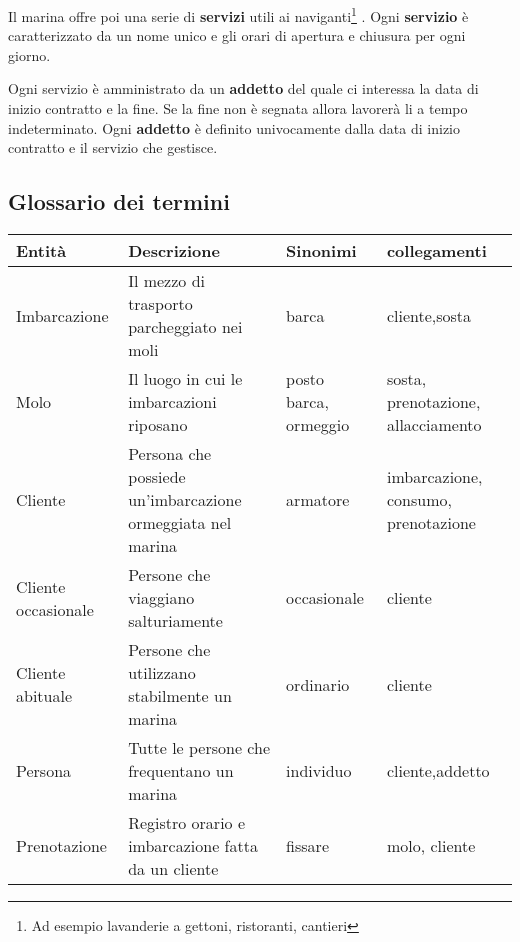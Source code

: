 Il marina offre poi una serie di \textbf{servizi} utili ai naviganti\footnote{Ad esempio lavanderie a gettoni, ristoranti, cantieri} . Ogni \textbf{servizio} è caratterizzato da un nome unico e gli orari di apertura e chiusura per ogni giorno.

Ogni servizio è amministrato da un \textbf{addetto} del quale ci interessa la data di inizio contratto e la fine. Se la fine non è segnata allora lavorerà li a tempo indeterminato. Ogni \textbf{addetto} è definito univocamente dalla data di inizio contratto e il servizio che gestisce.

\subsection{Glossario dei termini}

\begin{center}
    \begin{tabularx}{\textwidth}{|p{2.4cm}|p{8cm}|p{2.4cm}|X|}
        \hline
        \textbf{Entità} & \textbf{Descrizione} & \textbf{Sinonimi} & \textbf{collegamenti} \\
       
        \hline
        Imbarcazione & Il mezzo di trasporto parcheggiato nei moli & barca & cliente,sosta\\
        
        \hline
        Molo & Il luogo in cui le imbarcazioni riposano & posto barca, ormeggio &sosta,
        prenotazione, 
        allacciamento\\
        
        \hline
        Cliente& Persona che possiede un'imbarcazione ormeggiata nel  marina & armatore & imbarcazione,
        consumo,
        prenotazione\\
        
        
        \hline
        Cliente occasionale &Persone che viaggiano salturiamente &occasionale & cliente  \\
         
        \hline
        Cliente abituale & Persone che utilizzano stabilmente un marina & ordinario  & cliente \\
        
         
        \hline
        Persona& Tutte le persone che frequentano un marina   & individuo &cliente,addetto \\
        
        
        \hline
        Prenotazione &Registro orario e imbarcazione fatta da un cliente &fissare&molo, cliente \\
        

\end{tabularx}
\end{center}
